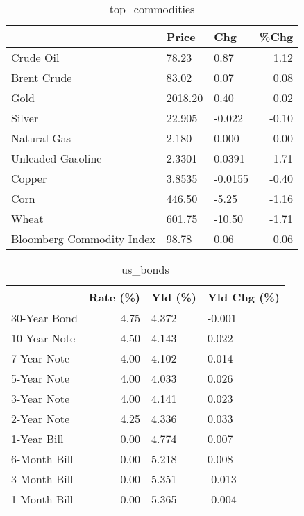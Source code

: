 \documentclass{article}%
\begin{document}
\begin{table}[htbp]%
\caption{top\_commodities}%
\centering%
\begin{adjustbox}{width=1\textwidth}%
\begin{tabular}{lllr}
\toprule
                          &   Price &     Chg &  \%Chg \\
\midrule
               Crude Oil  &   78.23 &    0.87 &  1.12 \\
             Brent Crude  &   83.02 &    0.07 &  0.08 \\
                    Gold  & 2018.20 &    0.40 &  0.02 \\
                  Silver  &  22.905 &  -0.022 & -0.10 \\
             Natural Gas  &   2.180 &   0.000 &  0.00 \\
       Unleaded Gasoline  &  2.3301 &  0.0391 &  1.71 \\
                  Copper  &  3.8535 & -0.0155 & -0.40 \\
                    Corn  &  446.50 &   -5.25 & -1.16 \\
                   Wheat  &  601.75 &  -10.50 & -1.71 \\
Bloomberg Commodity Index &   98.78 &    0.06 &  0.06 \\
\bottomrule
\end{tabular}
%
\end{adjustbox}%
\end{table}

%


\begin{table}[htbp]%
\caption{us\_bonds}%
\centering%
\begin{adjustbox}{width=1\textwidth}%
\begin{tabular}{lrll}
\toprule
             &  Rate (\%) & Yld (\%) & Yld Chg (\%) \\
\midrule
30-Year Bond &      4.75 &   4.372 &      -0.001 \\
10-Year Note &      4.50 &   4.143 &       0.022 \\
 7-Year Note &      4.00 &   4.102 &       0.014 \\
 5-Year Note &      4.00 &   4.033 &       0.026 \\
 3-Year Note &      4.00 &   4.141 &       0.023 \\
 2-Year Note &      4.25 &   4.336 &       0.033 \\
 1-Year Bill &      0.00 &   4.774 &       0.007 \\
6-Month Bill &      0.00 &   5.218 &       0.008 \\
3-Month Bill &      0.00 &   5.351 &      -0.013 \\
1-Month Bill &      0.00 &   5.365 &      -0.004 \\
\bottomrule
\end{tabular}
%
\end{adjustbox}%
\end{table}
\end{document}
